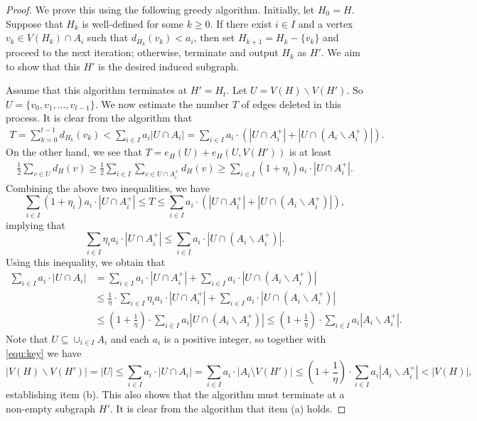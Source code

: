 \documentclass{aic}
\begin{document}
	
	\begin{proof}
		We prove this using the following greedy algorithm.
		Initially, let $H_0 = H$. Suppose that $H_k$ is well-defined for some $k \geq 0$.
		If there exist $i \in I$ and a vertex $v_k \in V(H_k) \cap A_i$ such that $d_{H_k}(v_k) < a_i$,
		then set $H_{k+1} = H_k - \{v_k\}$ and proceed to the next iteration; otherwise, terminate and output $H_k$ as $H'$.
		We aim to show that this $H'$ is the desired induced subgraph.
		
		
		Assume that this algorithm terminates at $H'=H_t$.
		Let $U=V(H)\backslash V(H')$. So $U=\{v_0,v_1,...,v_{t-1}\}$.
		We now estimate the number $T$ of edges deleted in this process.
		It is clear from the algorithm that
		\begin{align*}
			T=\sum_{k=0}^{t-1} d_{H_k}(v_k)<\sum_{i\in I} a_i |U\cap A_i|=\sum_{i\in I} a_i\cdot (|U\cap A^+_i|+|U\cap (A_i\backslash A^+_i)|).
		\end{align*}
		On the other hand, we see that $T=e_H(U)+e_H(U,V(H'))$ is at least
		\begin{align*}
			\frac{1}{2}\sum_{v\in U} d_H(v)
			\ge \frac{1}{2}\sum_{i\in I} \sum_{v\in U\cap A^+_i} d_H(v)\ge \sum_{i\in I}(1+\eta_i)a_i\cdot|U\cap A^+_i|.
		\end{align*}
		Combining the above two inequalities, we have
		$$\sum_{i\in I}(1+\eta_i)a_i\cdot|U\cap A^+_i|\leq T\leq \sum_{i\in I} a_i\cdot(|U\cap A^+_i|+|U\cap (A_i\backslash A^+_i)|),$$
		implying that $$\sum_{i\in I} \eta_ia_i\cdot |U\cap A^+_i|\leq \sum_{i\in I}a_i\cdot |U\cap (A_i\backslash A^+_i)|.$$
		Using this inequality, we obtain that
		\begin{align*}
			\sum_{i\in I} a_i\cdot |U\cap A_i|&= \sum_{i\in I} a_i\cdot |U\cap A^+_i|+\sum_{i\in I} a_i\cdot |U\cap (A_i\backslash A^+_i)|\\
			&\leq \frac{1}{\eta}\cdot \sum_{i\in I} \eta_i a_i\cdot |U\cap A^+_i|+\sum_{i\in I} a_i\cdot |U\cap (A_i\backslash A^+_i)|\\
			&\leq (1+\frac{1}{\eta})\cdot \sum_{i\in I} a_i |U\cap (A_i\backslash A^+_i)|\le (1+\frac{1}{\eta})\cdot \sum_{i\in I} a_i |A_i\backslash A^+_i|.
		\end{align*}
		Note that $U\subseteq \cup_{i\in I} A_i$ and each $a_i$ is a positive integer,
		so together with \eqref{equ:key} we have
		$$|V(H)\backslash V(H')|=|U|\leq \sum_{i\in I} a_i\cdot |U\cap A_i|=\sum_{i\in I} a_i\cdot |A_i \setminus V(H')|\leq (1+\frac{1}{\eta})\cdot \sum_{i\in I} a_i |A_i\backslash A^+_i|<|V(H)|,$$ establishing item (b).
		This also shows that the algorithm must terminate at a non-empty subgraph $H'$.
		It is clear from the algorithm that item (a) holds.
	\end{proof}
	
\end{document}
